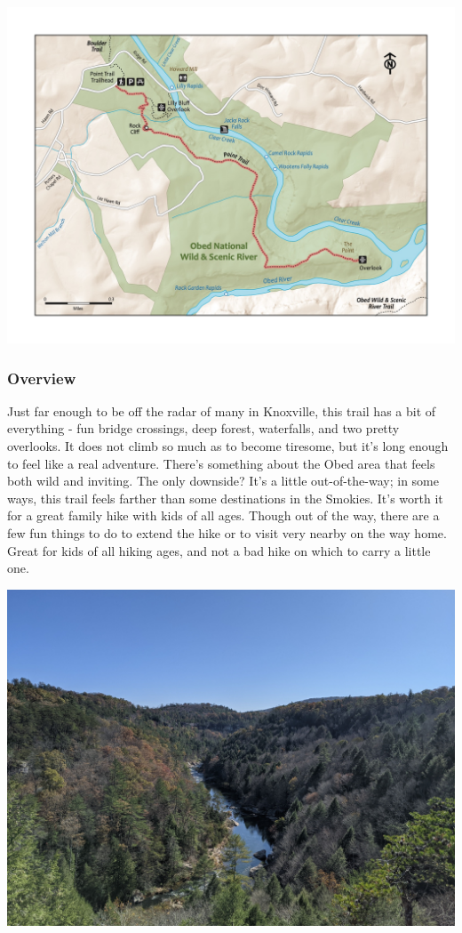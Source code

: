 \documentclass[
  letterpaper,
  DIV=11,
  numbers=noendperiod]{scrartcl}
\begin{document}
\includegraphics{maps/trail-14-map.jpeg}

\hypertarget{overview-13}{%
\subsubsection{Overview}\label{overview-13}}

Just far enough to be off the radar of many in Knoxville, this trail has
a bit of everything - fun bridge crossings, deep forest, waterfalls, and
two pretty overlooks. It does not climb so much as to become tiresome,
but it's long enough to feel like a real adventure. There's something
about the Obed area that feels both wild and inviting. The only
downside? It's a little out-of-the-way; in some ways, this trail feels
farther than some destinations in the Smokies. It's worth it for a great
family hike with kids of all ages. Though out of the way, there are a
few fun things to do to extend the hike or to visit very nearby on the
way home. Great for kids of all hiking ages, and not a bad hike on which
to carry a little one.

\includegraphics{img/trail-14-figure-01.jpg}
\end{document}
